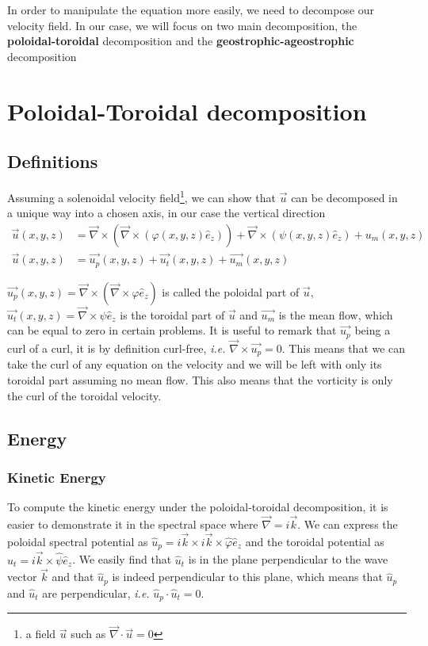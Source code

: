 In order to manipulate the equation more easily, we need to decompose our velocity field. In our case, we will focus on two main decomposition, the \textbf{poloidal-toroidal} decomposition and the \textbf{geostrophic-ageostrophic} decomposition

\section{Poloidal-Toroidal decomposition}
\subsection{Definitions}

Assuming a solenoidal velocity field\footnote{a field $\vec{u}$ such as $\vec{\nabla} \cdot \vec{u} = 0$}, we can show that $\vec{u}$ can be decomposed in a unique way into a chosen axis\cite{schmitt_decomposition_1992}, in our case the vertical direction 
\begin{align}
	\vec{u} (x,y,z) & = \vec{\nabla} \times \left( \vec{\nabla} \times \left( \varphi(x,y,z) \hat{e}_z \right) \right) + \vec{\nabla} \times \left( \psi (x,y,z) \hat{e}_z \right) + u_m(x,y,z) \\
	\vec{u} (x,y,z) & = \vec{u_p}(x,y,z) + \vec{u_t}(x,y,z) + \vec{u_m}(x,y,z)
\end{align}

$\vec{u_p}(x,y,z) = \vec{\nabla} \times \left( \vec{\nabla} \times \varphi \hat{e}_z \right)$ is called the poloidal part of $\vec{u}$, $\vec{u_t}(x,y,z) = \vec{\nabla} \times \psi \hat{e}_z$ is the toroidal part of $\vec{u}$ and $\vec{u_m}$ is the mean flow, which can be equal to zero in certain problems. It is useful to remark that $\vec{u_p}$ being a curl of a curl, it is by definition curl-free, \textit{i.e.} $\vec{\nabla} \times \vec{u_p} = 0$. This means that we can take the curl of any equation on the velocity and we will be left with only its toroidal part assuming no mean flow. This also means that the vorticity is only the curl of the toroidal velocity.

\subsection{Energy}
\subsubsection{Kinetic Energy}

To compute the kinetic energy under the poloidal-toroidal decomposition, it is easier to demonstrate it in the spectral space where $\vec{\nabla} = i \vec{k}$. We can express the poloidal spectral potential as $\hat{u}_p = i \vec{k} \times i \vec{k} \times \hat{\varphi} \hat{e}_z$ and the toroidal potential as $\hat{u}_t = i \vec{k} \times \hat{\psi} \hat{e}_z$. We easily find that $\hat{u}_t$ is in the plane perpendicular to the wave vector $\vec{k}$ and that $\hat{u}_p$ is indeed perpendicular to this plane, which means that $\hat{u}_p$ and $\hat{u}_t$ are perpendicular, \textit{i.e.} $\hat{u}_p \cdot \hat{u}_t = 0$.

